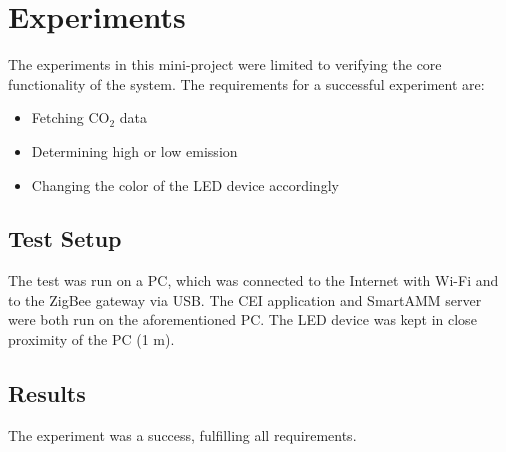 \documentclass[Main]{subfiles}
\begin{document}
\section{Experiments} %
\label{sec:experiments} 
	The experiments in this mini-project were limited to verifying the core functionality of the system. 
	The requirements for a successful experiment are:

	\begin{itemize}
		\item Fetching CO$_2$ data
		\item Determining high or low emission
		\item Changing the color of the LED device accordingly
	\end{itemize}

	\subsection{Test Setup} %
		The test was run on a PC, which was connected to the Internet with Wi-Fi and to the ZigBee gateway via USB.  
		The CEI application and SmartAMM server were both run on the aforementioned PC.
		The LED device was kept in close proximity of the PC (1 m).
	\label{sub:test_setup}

	\subsection{Results} %
	\label{sub:results}
		The experiment was a success, fulfilling all requirements. 
	
	
	 


\end{document}
